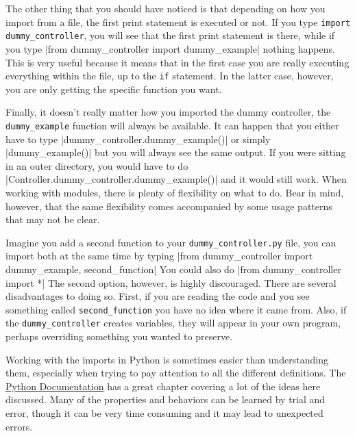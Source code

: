 The other thing that you should have noticed is that depending on how
you import from a file, the first print statement is executed or not. If
you type \texttt{import dummy_controller}, you will see that the first
print statement is there, while if you type
|from dummy_controller import dummy_example| nothing
happens. This is very useful because it means that in the first case you
are really executing everything within the file, up to the \texttt{if}
statement. In the latter case, however, you are only getting the
specific function you want.

Finally, it doesn't really matter how you imported the
dummy controller, the \texttt{dummy_example} function will
always be available. It can happen that you either have to type
|dummy_controller.dummy_example()| or simply
|dummy_example()| but you will always see the same output. If
you were sitting in an outer directory, you would have to do
|Controller.dummy_controller.dummy_example()| and it would
still work. When working with modules, there is plenty of flexibility on
what to do. Bear in mind, however, that the same flexibility comes
accompanied by some usage patterns that may not be clear.

Imagine you add a second function to your \texttt{dummy_controller.py}
file, you can import both at the same time by typing
|from dummy_controller import dummy_example, second_function|
You could also do |from dummy_controller import *| The
second option, however, is highly discouraged. There are several
disadvantages to doing so. First, if you are reading the code and you
see something called \texttt{second_function} you have no idea where it
came from. Also, if the \texttt{dummy_controller} creates variables,
they will appear in your own program, perhaps overriding something you
wanted to preserve.


Working with the imports in Python is sometimes easier than
understanding them, especially when trying to pay attention to all the
different definitions. The
\href{https://docs.python.org/3.6/tutorial/modules.html}{Python
Documentation} has a great chapter covering a lot of the ideas here
discussed. Many of the properties and behaviors can be learned by trial
and error, though it can be very time consuming and it may lead to
unexpected errors.

